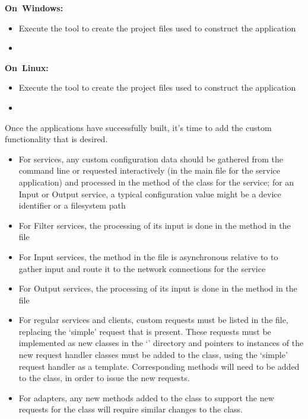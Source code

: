 \begin{center}\textbf{On~Windows:}\end{center}
\begin{itemize}
\item Execute the tool  to create the project files used to construct the
application
\item\exSp\TBD
\end{itemize}
\begin{center}\textbf{On~Linux:}\end{center}
\begin{itemize}
\item Execute the tool  to create the project files used to construct the
application
\item\exSp\TBD
\end{itemize}
\tertiaryEnd
{}
Once the applications have successfully built, it's time to add the custom functionality
that is desired.
\begin{itemize}
\item For  services, any custom configuration data should be gathered from
the command line or requested interactively (in the main file for the service
application) and processed in the  method of the class for the service;
for an Input or Output service, a typical configuration value might be a device
identifier or a file\longDash{}system path
\item\exSp{} For Filter services, the processing of its input is done in the
 method in the\\
 file
\item\exSp{} For Input services, the  method in the
 file is asynchronous \longDash{} relative to \mplusm{}
\longDash{} to gather input and route it to the \yarp{} network connections for the
service
\item\exSp{} For Output services, the processing of its input is done in the
 method in the\\
 file
\item\exSp{} For regular services and clients, custom requests must be listed in the
 file, replacing the `simple' request that is present.
These requests must be implemented as new classes in the `' directory
and pointers to instances of the new request handler classes must be added to the
 class, using the `simple' request handler as a template.
Corresponding methods will need to be added to the  class, in order to
issue the new requests.
\item\exSp{} For adapters, any new methods added to the  class to
support the new requests for the  class will require similar changes to
the  class.
\end{itemize}
